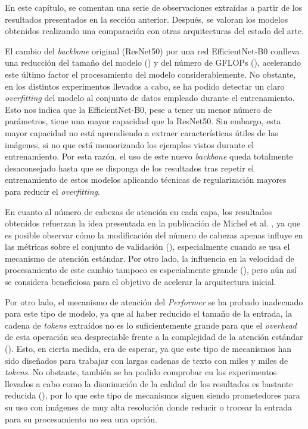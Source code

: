 
En este capítulo, se comentan una serie de observaciones extraídas a partir de los resultados presentados en la sección anterior. Después, se valoran los modelos obtenidos realizando una comparación con otras arquitecturas del estado del arte.

El cambio del \textit{backbone} original (ResNet50) por una red EfficientNet-B0 conlleva una reducción del tamaño del modelo () y del número de GFLOPs (), acelerando este último factor el procesamiento del modelo considerablemente. No obstante, en los distintos experimentos llevados a cabo, se ha podido detectar un claro \textit{overfitting} del modelo al conjunto de datos empleado durante el entrenamiento. Esto nos indica que la EfficientNet-B0, pese a tener un menor número de parámetros, tiene una mayor capacidad que la ResNet50. Sin embargo, esta mayor capacidad no está aprendiendo a extraer características útiles de las imágenes, si no que está memorizando los ejemplos vistos durante el entrenamiento. Por esta razón, el uso de este nuevo \textit{backbone} queda totalmente desaconsejado hasta que se disponga de los resultados tras repetir el entrenamiento de estos modelos aplicando técnicas de regularización mayores para reducir el \textit{overfitting}.

En cuanto al número de cabezas de atención en cada capa, los resultados obtenidos refuerzan la idea presentada en la publicación de Michel et al. \cite{are16headsbetterthan1}, ya que es posible observar cómo la modificación del número de cabezas apenas influye en las métricas sobre el conjunto de validación (), especialmente cuando se usa el mecanismo de atención estándar. Por otro lado, la influencia en la velocidad de procesamiento de este cambio tampoco es especialmente grande (), pero aún así se considera beneficiosa para el objetivo de acelerar la arquitectura inicial.

Por otro lado, el mecanismo de atención del \textit{Performer} se ha probado inadecuado para este tipo de modelo, ya que al haber reducido el tamaño de la entrada, la cadena de \textit{tokens} extraídos no es lo suficientemente grande para que el \textit{overhead} de esta operación sea despreciable frente a la complejidad de la atención estándar (). Esto, en cierta medida, era de esperar, ya que este tipo de mecanismos han sido diseñados para trabajar con largas cadenas de texto con miles y miles de \textit{tokens}. No obstante, también se ha podido comprobar en los experimentos llevados a cabo como la disminución de la calidad de los resultados es bastante reducida (), por lo que este tipo de mecanismos siguen siendo prometedores para su uso con imágenes de muy alta resolución donde reducir o trocear la entrada para su procesamiento no sea una opción.

